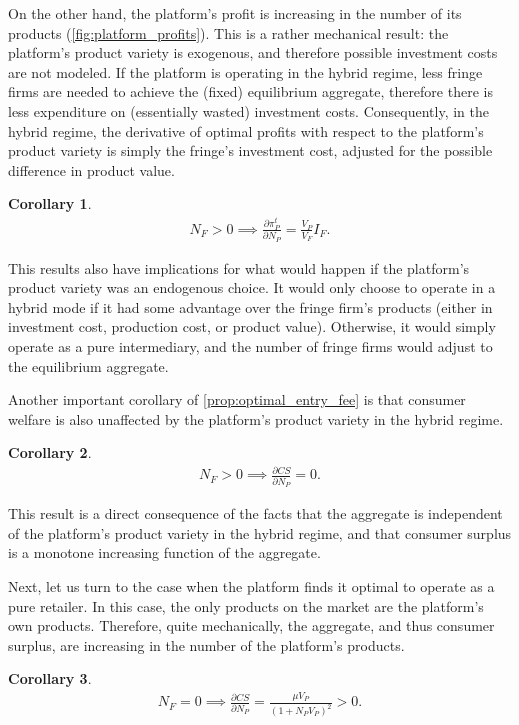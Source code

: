 \documentclass[a4paper]{article}
\newtheorem{corollary}{Corollary}
\begin{document}
On the other hand, the platform's profit is increasing in the number of its products (\cref{fig:platform_profits}).
This is a rather mechanical result: the platform's product variety is exogenous, and therefore possible investment costs are not modeled.
If the platform is operating in the hybrid regime, less fringe firms are needed to achieve the (fixed) equilibrium aggregate, therefore there is less expenditure on (essentially wasted) investment costs.
Consequently, in the hybrid regime, the derivative of optimal profits with respect to the platform's product variety is simply the fringe's investment cost, adjusted for the possible difference in product value.
\begin{corollary}
    \begin{align*}
        N_F > 0 \implies \frac{\partial \pi_P^t}{\partial N_P} = \frac{V_P}{V_F} I_F.
    \end{align*}
\end{corollary}
This results also have implications for what would happen if the platform's product variety was an endogenous choice.
It would only choose to operate in a hybrid mode if it had some advantage over the fringe firm's products (either in investment cost, production cost, or product value).
Otherwise, it would simply operate as a pure intermediary, and the number of fringe firms would adjust to the equilibrium aggregate.

Another important corollary of \cref{prop:optimal_entry_fee} is that consumer welfare is also unaffected by the platform's product variety in the hybrid regime.
\begin{corollary}
    \label{prop:consumer_surplus_benchmark}
    \begin{align*}
        N_F > 0 \implies \frac{\partial CS}{\partial N_P} = 0.
    \end{align*}
\end{corollary}
This result is a direct consequence of the facts that the aggregate is independent of the platform's product variety in the hybrid regime, and that consumer surplus is a monotone increasing function of the aggregate.

Next, let us turn to the case when the platform finds it optimal to operate as a pure retailer.
In this case, the only products on the market are the platform's own products.
Therefore, quite mechanically, the aggregate, and thus consumer surplus, are increasing in the number of the platform's products.
\begin{corollary}
    \begin{align*}
        N_F = 0 \implies \frac{\partial CS}{\partial N_P} = \frac{\mu V_P}{(1 + N_P V_P)^2} > 0.
    \end{align*}
\end{corollary}
\end{document}
